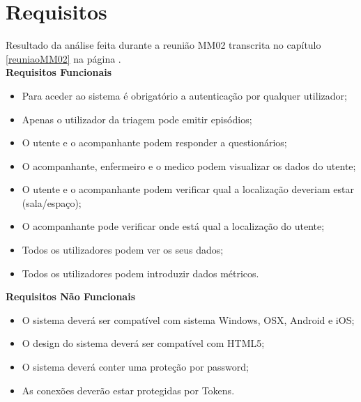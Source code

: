 
\section{Requisitos}

\noindent Resultado da análise feita durante a reunião MM02 transcrita no capítulo \ref{reuniaoMM02} na página \pageref{reuniaoMM02}. \\

\noindent\textbf{Requisitos Funcionais} \\[4mm]
\begin{minipage}{\linewidth}
\begin{itemize}
	\item Para aceder ao sistema é obrigatório a autenticação por qualquer utilizador;
	\item Apenas o utilizador da triagem pode emitir episódios;
	\item O utente e o acompanhante podem responder a questionários;
	\item O acompanhante, enfermeiro e o medico podem visualizar os dados do utente;
	\item O utente e o acompanhante podem verificar qual a localização deveriam estar (sala/espaço);
	\item O acompanhante pode verificar onde está qual a localização do utente;
	\item Todos os utilizadores podem ver os seus dados;
	\item Todos os utilizadores podem introduzir dados métricos.
\end{itemize}
\end{minipage}
\newline

\noindent\textbf{Requisitos Não Funcionais} \\[4mm]
\begin{minipage}{\linewidth}
\begin{itemize}
	\item O sistema deverá ser compatível com sistema Windows, OSX, Android e iOS;
	\item O design do sistema deverá ser compatível com HTML5;
	\item O sistema deverá conter uma proteção por password;
	\item As conexões deverão estar protegidas por Tokens.
\end{itemize}
\end{minipage}
\newline
